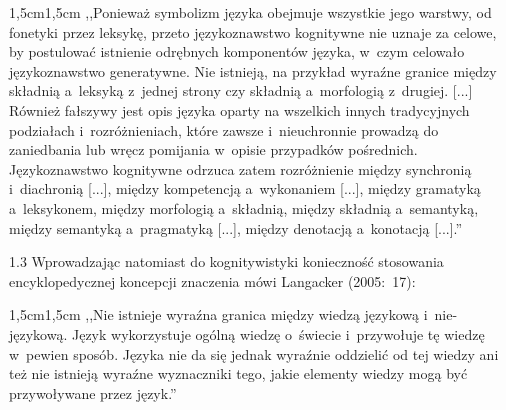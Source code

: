 \documentclass[11pt,a4paper,twoside]{report}
\begin{document}
\begin{adjustwidth}{1,5cm}{1,5cm}
\small{
,,Ponieważ symbolizm języka obejmuje wszystkie jego warstwy, od fonetyki przez leksykę, przeto językoznawstwo kognitywne nie uznaje za celowe, by postulować istnienie odrębnych komponentów języka, w~czym celowało językoznawstwo generatywne. Nie istnieją, na przykład wyraźne granice między składnią a~leksyką z~jednej strony czy składnią a~morfologią z~drugiej. [...] Również fałszywy jest opis języka oparty na wszelkich innych tradycyjnych podziałach i~rozróżnieniach, które zawsze i~nieuchronnie prowadzą do zaniedbania lub wręcz pomijania w~opisie przypadków pośrednich. Językoznawstwo kognitywne odrzuca zatem rozróżnienie między synchronią i~diachronią [...], między kompetencją a~wykonaniem [...], między gramatyką a~leksykonem, między morfologią a~składnią, między składnią a~semantyką, między semantyką a~pragmatyką [...], między denotacją a~konotacją [...].''} \\
\end{adjustwidth}
\begin{spacing}{1.3}
Wprowadzając natomiast do kognitywistyki konieczność stosowania encyklopedycznej koncepcji znaczenia mówi Langacker (2005:~17):
\end{spacing}
\begin{adjustwidth}{1,5cm}{1,5cm}
\small{
,,Nie istnieje wyraźna granica między wiedzą językową i~nie-językową. Język wykorzystuje ogólną wiedzę o~świecie i~przywołuje tę wiedzę w~pewien sposób. Języka nie da się jednak wyraźnie oddzielić od tej wiedzy ani też nie istnieją wyraźne wyznaczniki tego, jakie elementy wiedzy mogą być przywoływane przez język.''}\\
\end{adjustwidth}
\end{document}
